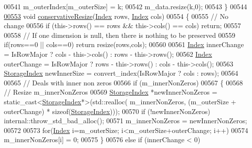 \begin{DoxyCode}
00541       m\_outerIndex[m\_outerSize] = k;
00542       m\_data.resize(k,0);
00543     \}
00544 
\hyperlink{group___sparse_core___module_a9dc538b2c1fe9027ba58f31ee83b2ff1}{00553}     \textcolor{keywordtype}{void} \hyperlink{group___sparse_core___module_a9dc538b2c1fe9027ba58f31ee83b2ff1}{conservativeResize}(\hyperlink{group___core___module_a554f30542cc2316add4b1ea0a492ff02}{Index} rows, \hyperlink{group___core___module_a554f30542cc2316add4b1ea0a492ff02}{Index} cols) 
00554     \{
00555       \textcolor{comment}{// No change}
00556       \textcolor{keywordflow}{if} (this->rows() == rows && this->cols() == cols) \textcolor{keywordflow}{return};
00557       
00558       \textcolor{comment}{// If one dimension is null, then there is nothing to be preserved}
00559       \textcolor{keywordflow}{if}(rows==0 || cols==0) \textcolor{keywordflow}{return} resize(rows,cols);
00560 
00561       \hyperlink{group___core___module_a554f30542cc2316add4b1ea0a492ff02}{Index} innerChange = IsRowMajor ? cols - this->cols() : rows - this->rows();
00562       \hyperlink{group___core___module_a554f30542cc2316add4b1ea0a492ff02}{Index} outerChange = IsRowMajor ? rows - this->rows() : cols - this->cols();
00563       \hyperlink{group___sparse_core___module_a0b540ba724726ebe953f8c0df06081ed}{StorageIndex} newInnerSize = convert\_index(IsRowMajor ? cols : rows);
00564 
00565       \textcolor{comment}{// Deals with inner non zeros}
00566       \textcolor{keywordflow}{if} (m\_innerNonZeros)
00567       \{
00568         \textcolor{comment}{// Resize m\_innerNonZeros}
00569         \hyperlink{group___sparse_core___module_a0b540ba724726ebe953f8c0df06081ed}{StorageIndex} *newInnerNonZeros = \textcolor{keyword}{static\_cast<}\hyperlink{group___sparse_core___module_a0b540ba724726ebe953f8c0df06081ed}{StorageIndex}*\textcolor{keyword}{>}(std::realloc(
      m\_innerNonZeros, (m\_outerSize + outerChange) * \textcolor{keyword}{sizeof}(\hyperlink{group___sparse_core___module_a0b540ba724726ebe953f8c0df06081ed}{StorageIndex})));
00570         \textcolor{keywordflow}{if} (!newInnerNonZeros) internal::throw\_std\_bad\_alloc();
00571         m\_innerNonZeros = newInnerNonZeros;
00572         
00573         \textcolor{keywordflow}{for}(\hyperlink{group___core___module_a554f30542cc2316add4b1ea0a492ff02}{Index} i=m\_outerSize; i<m\_outerSize+outerChange; i++)          
00574           m\_innerNonZeros[i] = 0;
00575       \} 
00576       \textcolor{keywordflow}{else} \textcolor{keywordflow}{if} (innerChange < 0) 

\end{DoxyCode}
